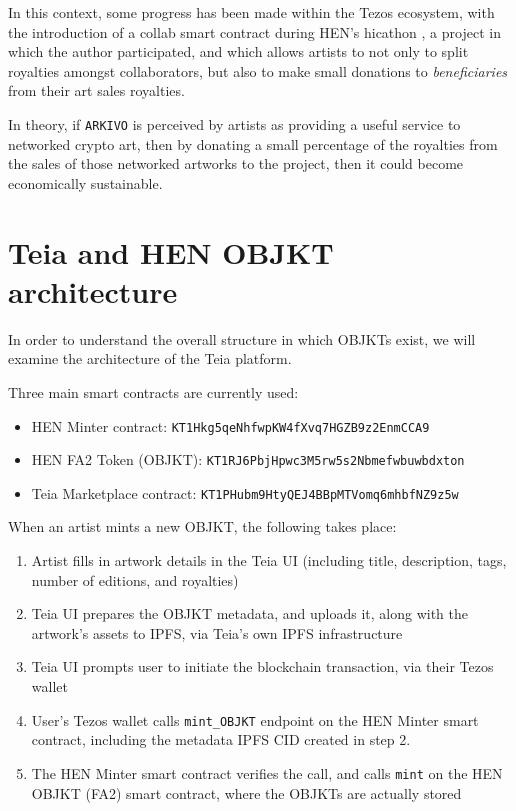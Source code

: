 In this context, some progress has been made within the Tezos ecosystem, with the introduction of a collab smart contract during HEN's hicathon \cite{HicathonDocsWG2021}, a project in which the author participated, and which allows artists to not only to split royalties amongst collaborators, but also to make small donations to \emph{beneficiaries} from their art sales royalties.

In theory, if \texttt{ARKIVO} is perceived by artists as providing a useful service to networked crypto art, then by donating a small percentage of the royalties from the sales of those networked artworks to the project, then it could become economically sustainable.

\section{Teia and HEN OBJKT architecture}

In order to understand the overall structure in which OBJKTs exist, we will examine the architecture of the Teia platform.

Three main smart contracts are currently used:

\begin{itemize}
    \item HEN Minter contract: \texttt{KT1Hkg5qeNhfwpKW4fXvq7HGZB9z2EnmCCA9} 
    \item HEN FA2 Token (OBJKT): \texttt{KT1RJ6PbjHpwc3M5rw5s2Nbmefwbuwbdxton}
    \item Teia Marketplace contract: \texttt{KT1PHubm9HtyQEJ4BBpMTVomq6mhbfNZ9z5w}
\end{itemize}

When an artist mints a new OBJKT, the following takes place:

\begin{enumerate}
    \item Artist fills in artwork details in the Teia UI (including title, description, tags, number of editions, and royalties)
    \item Teia UI prepares the OBJKT metadata, and uploads it, along with the artwork's assets to IPFS, via Teia's own IPFS infrastructure
    \item Teia UI prompts user to initiate the blockchain transaction, via their Tezos wallet
    \item User's Tezos wallet calls \texttt{mint\_OBJKT} endpoint on the HEN Minter smart contract, including the metadata IPFS CID created in step 2.
    \item The HEN Minter smart contract verifies the call, and calls \texttt{mint} on the HEN OBJKT (FA2) smart contract, where the OBJKTs are actually stored
\end{enumerate}

